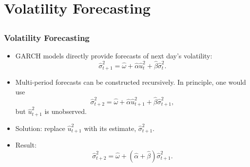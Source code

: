 \section[Forecasting]{Volatility Forecasting}\subsection*{}
\begin{frame}

\frametitle{Volatility Forecasting}

\begin{itemize}
\item GARCH models directly provide forecasts of next day's volatility:
\[
\widehat{\sigma} _{t+1}^{2}=\hat{\omega}+\hat{\alpha}\hat{u}_{t}^{2}+\hat{\beta} \widehat{\sigma} _{t}^{2}.
\]

%
\item Multi-period forecasts can be constructed recursively. In principle, one would use
\[
\widehat{\sigma} _{t+2}^{2}=\hat{\omega}+\hat{\alpha}\hat{u}_{t+1}^{2}+\hat{\beta} \widehat{\sigma} _{t+1}^{2},
\]
but $\hat{u}_{t+1}^{2}$ is unobserved.
\item Solution: replace $\hat{u}_{t+1}^{2}$ with its estimate, $\widehat{\sigma} _{t+1}^{2}$.
\item Result:
\[
\widehat{\sigma} _{t+2}^{2}=\hat{\omega}+\left(\hat{\alpha}+\hat{\beta}\right) \widehat{\sigma} _{t+1}^{2}.
\] 
\end{itemize}

\end{frame}%
%
